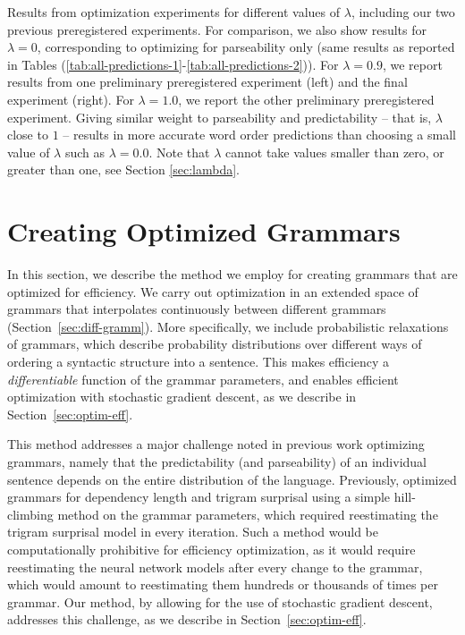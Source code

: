 \documentclass[10pt,twoside,lineno]{article}
\begin{document}
\begin{table}[hbt!]
\caption{Results from optimization experiments for different values of $\lambda$, including our two previous preregistered experiments. For comparison, we also show results for $\lambda=0$, corresponding to optimizing for parseability only (same results as reported in Tables (\ref{tab:all-predictions-1}-\ref{tab:all-predictions-2})). For $\lambda=0.9$, we report results from one preliminary preregistered experiment (left) and the final experiment (right). For $\lambda=1.0$, we report the other preliminary preregistered experiment.
Giving similar weight to parseability and predictability -- that is, $\lambda$ close to $1$ -- results in more accurate word order predictions than choosing a small value of $\lambda$ such as $\lambda=0.0$. Note that $\lambda$ cannot take values smaller than zero, or greater than one, see Section \ref{sec:lambda}.
}\label{table:corr-resu-previous}
\end{table}


\section{Creating Optimized Grammars}

In this section, we describe the method we employ for creating grammars that are optimized for efficiency.
We carry out optimization in an extended space of grammars that interpolates continuously between different grammars (Section~\ref{sec:diff-gramm}).
More specifically, we include probabilistic relaxations of grammars, which describe probability distributions over different ways of ordering a syntactic structure into a sentence.
This makes efficiency a \emph{differentiable} function of the grammar parameters, and enables efficient optimization with stochastic gradient descent, as we describe in Section~\ref{sec:optim-eff}.

This method addresses a major challenge noted in previous work optimizing grammars, namely that the predictability (and parseability) of an individual sentence depends on the entire distribution of the language.
Previously, \citet{gildea2015human} optimized grammars for dependency length and trigram surprisal using a simple hill-climbing method on the grammar parameters, which required reestimating the trigram surprisal model in every iteration.
Such a method would be computationally prohibitive for efficiency optimization, as it would require reestimating the neural network models after every change to the grammar, which would amount to reestimating them hundreds or thousands of times per grammar.
Our method, by allowing for the use of stochastic gradient descent, addresses this challenge, as we describe in Section~\ref{sec:optim-eff}.
\end{document}
